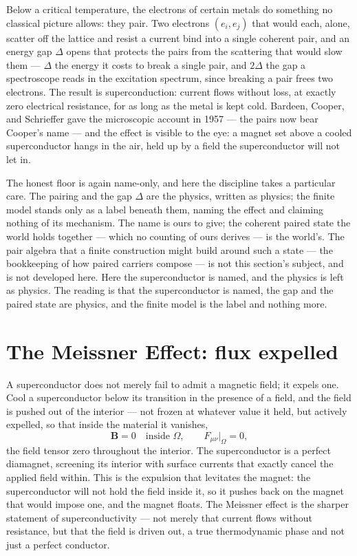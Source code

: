 Below a critical temperature, the electrons of certain metals do something no classical picture allows: they
pair. Two electrons $(e_i, e_j)$ that would each, alone, scatter off the lattice and resist a current bind
into a single coherent pair, and an
energy gap $\Delta$ opens that protects the pairs from the scattering that would slow them --- $\Delta$ the
energy it costs to break a single pair, and $2\Delta$ the gap a spectroscope reads in the excitation spectrum,
since breaking a pair frees two electrons. The result is
superconduction: current flows without loss, at exactly zero electrical resistance, for as long as the metal
is kept cold. Bardeen, Cooper, and Schrieffer gave the microscopic account in 1957 --- the pairs now bear
Cooper's name --- and the effect is visible to the eye: a magnet set above a cooled superconductor hangs in
the air, held up by a field the superconductor will not let in.

The honest floor is again name-only, and here the discipline takes a particular care. The pairing and the gap
$\Delta$ are the physics, written as physics; the finite model stands only as a label beneath them, naming the
effect and claiming nothing of its mechanism. The name is ours to give; the coherent paired state the world
holds together --- which no counting of ours derives --- is the world's. The pair algebra that a finite
construction might build around such a state --- the bookkeeping of how paired carriers compose --- is not this
section's subject, and is not developed here. Here the superconductor is named, and the physics is left as
physics. The reading is that the superconductor is named, the gap and the paired state are physics, and the
finite model is the label and nothing more.

\section{The Meissner Effect: flux expelled}
\label{se:meissner}

A superconductor does not merely fail to admit a magnetic field; it expels one. Cool a superconductor below
its transition in the presence of a field, and the field is pushed out of the interior --- not frozen at
whatever value it held, but actively expelled, so that inside the material it vanishes,
\begin{equation}
  \mathbf{B} = 0 \quad\text{inside } \Omega, \qquad F_{\mu\nu}\big|_{\Omega} = 0,
\end{equation}
the field tensor zero throughout the interior. The superconductor is a perfect diamagnet, screening its
interior with surface currents that exactly cancel the applied field within. This is the expulsion that
levitates the magnet: the superconductor will not hold the field inside it, so it pushes back on the magnet
that would impose one, and the magnet floats. The Meissner effect is the sharper statement of
superconductivity --- not merely that current flows without resistance, but that the field is driven out, a
true thermodynamic phase and not just a perfect conductor.


